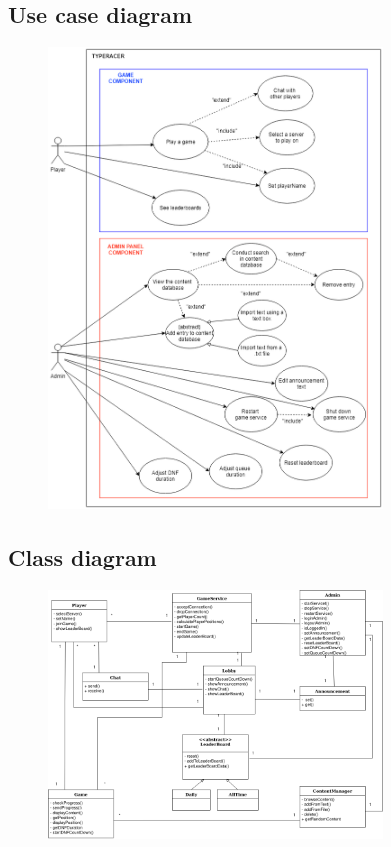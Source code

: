 \documentclass{article}
\begin{document}
\newpage
\subsection{Use case diagram}
\begin{figure}[h]
	\centering
	\includegraphics[width=0.79\textwidth]{use_case_diagram.png}
\end{figure}
\newpage

\subsection{Class diagram}

\begin{figure}[h]
	\centering
	\includegraphics[width=0.79\textwidth]{class_diagram.png}
\end{figure}
\end{document}
